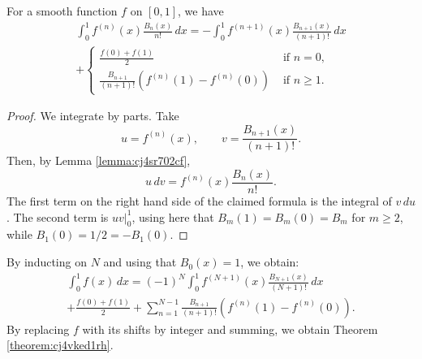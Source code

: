\documentclass[reqno]{amsart} 
\begin{document}
\begin{lemma}
  For a smooth function $f$ on $[0,1]$, we have
  \begin{multline*}
    \int_0^1 f^{(n)} (x) \frac{B_n (x) }{n !} \, d x
    = - \int_0^1 f^{(n + 1 )} (x)
    \frac{B_{n + 1 } (x) }{ (n + 1 )! } \, d x \\
    +
    \begin{cases}
      \frac{f (0) + f (1) }{2} & \text{ if } n = 0, \\
      \frac{B_{n + 1}}{(n + 1 )!} \left( f^{(n)} (1) - f^{(n)} (0)  \right) &  \text{ if } n \geq 1.
    \end{cases}
  \end{multline*}
\end{lemma}
\begin{proof}
  We integrate by parts.  Take
  \begin{equation*}
u = f^{(n)}(x), \qquad v = \frac{B_{n+1}(x)}{(n+1)!}.
  \end{equation*}
  Then, by Lemma \ref{lemma:cj4sr702cf},
  \begin{equation*}
u \, d v  = f^{(n )} (x)  \frac{B_n (x) }{n !}.
  \end{equation*}
  The first term on the right hand side of the claimed formula is the integral of $v \, d u$.  The second term is $u v |_{0}^1$, using here that $B_m(1) = B_m(0) = B_m$ for $m \geq 2$, while $B_1(0) = 1/2 = - B_1(0)$.
\end{proof}

By inducting on $N$ and using that $B_0(x) = 1$, we obtain:
\begin{multline*}
  \int_0^1 f(x) \, d x
  = (-1)^N \int_0^1 f^{(N + 1 )} (x)
  \frac{B_{N + 1 } (x) }{ (N + 1 )! } \, d x \\
  +
  \frac{f (0) + f (1) }{2}
  + 
  \sum_{n = 1}^{N - 1} \frac{B_{n + 1}}{(n + 1 )!} \left( f^{(n)} (1) - f^{(n)} (0)  \right).
\end{multline*}
By replacing $f$ with its shifts by integer and summing, we obtain Theorem \ref{theorem:cj4vked1rh}.




{} 
\end{document}
